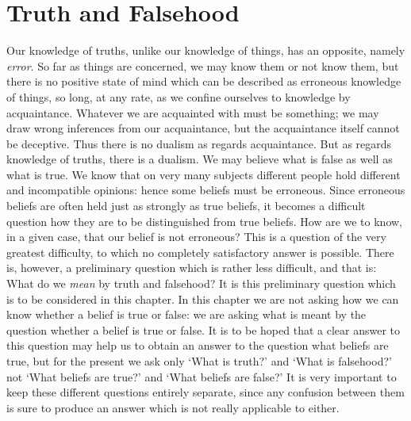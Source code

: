 \documentclass[oneside,letterpaper,12pt]{book}
\begin{document}
\hypertarget{chapter-xii.-truth-and-falsehood}{%
\chapter{Truth and Falsehood}\label{chapter-xii.-truth-and-falsehood}}
Our knowledge of truths, unlike our knowledge of things, has an
opposite, namely \emph{error}. So far as things are concerned, we may
know them or not know them, but there is no positive state of mind which
can be described as erroneous knowledge of things, so long, at any rate,
as we confine ourselves to knowledge by acquaintance. Whatever we are
acquainted with must be something; we may draw wrong inferences from our
acquaintance, but the acquaintance itself cannot be deceptive. Thus
there is no dualism as regards acquaintance. But as regards knowledge of
truths, there is a dualism. We may believe what is false as well as what
is true. We know that on very many subjects different people hold
different and incompatible opinions: hence some beliefs must be
erroneous. Since erroneous beliefs are often held just as strongly as
true beliefs, it becomes a difficult question how they are to be
distinguished from true beliefs. How are we to know, in a given case,
that our belief is not erroneous? This is a question of the very
greatest difficulty, to which no completely satisfactory answer is
possible. There is, however, a preliminary question which is rather less
difficult, and that is: What do we \emph{mean} by truth and falsehood?
It is this preliminary question which is to be considered in this
chapter. In this chapter we are not asking how we can know whether a
belief is true or false: we are asking what is meant by the question
whether a belief is true or false. It is to be hoped that a clear answer
to this question may help us to obtain an answer to the question what
beliefs are true, but for the present we ask only `What is truth?' and 
`What is falsehood?' not `What beliefs are true?' and 
`What beliefs are false?' It is very important to keep these different
questions entirely separate, since any confusion between them is 
sure to produce an answer which is not really applicable to either.
\end{document}
